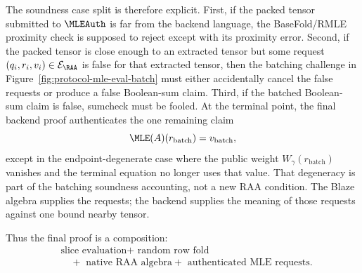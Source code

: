 The soundness case split is therefore explicit.  First, if the packed tensor
submitted to \(\MLEAuth\) is far from the backend language, the BaseFold/RMLE
proximity check is supposed to reject except with its proximity error.  Second,
if the packed tensor is close enough to an extracted tensor but some request
\((q_i,r_i,v_i)\in\mathcal E_{\RAA}\) is false for that extracted tensor, then
the batching challenge in Figure~\ref{fig:protocol-mle-eval-batch} must either
accidentally cancel the false requests or produce a false Boolean-sum claim.
Third, if the batched Boolean-sum claim is false, sumcheck must be fooled.  At
the terminal point, the final backend proof authenticates the one remaining
claim
\[
  \MLE(A)(r_{\mathrm{batch}})=v_{\mathrm{batch}},
\]
except in the endpoint-degenerate case where the public weight
\(W_\gamma(r_{\mathrm{batch}})\) vanishes and the terminal equation no longer
uses that value.  That degeneracy is part of the batching soundness accounting,
not a new RAA condition.  The Blaze algebra supplies the requests; the backend
supplies the meaning of those requests against one bound nearby tensor.

Thus the final proof is a composition:
\[
  \begin{aligned}
  &\text{slice evaluation}
  +\text{ random row fold}\\
  &\quad+\text{ native RAA algebra}
  +\text{ authenticated MLE requests}.
  \end{aligned}
\]
